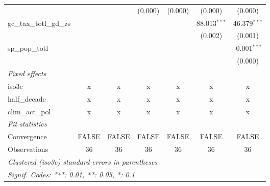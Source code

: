 \begin{tabular}{lcccccc}
                                                        &                   &                 & (0.000)           & (0.000)           & (0.000)           & (0.000)\\   
   gc\_tax\_totl\_gd\_zs                                &                   &                 &                   &                   & 88.013$^{***}$    & 46.379$^{***}$\\   
                                                        &                   &                 &                   &                   & (0.002)           & (0.001)\\   
   sp\_pop\_totl                                        &                   &                 &                   &                   &                   & -0.001$^{***}$\\   
                                                        &                   &                 &                   &                   &                   & (0.000)\\   
   \emph{Fixed effects}\\
   iso3c                                                & x                 & x               & x                 & x                 & x                 & x\\  
   half\_decade                                         & x                 & x               & x                 & x                 & x                 & x\\  
   clim\_act\_pol                                       & x                 & x               & x                 & x                 & x                 & x\\  
   \midrule \emph{Fit statistics}\\
   Convergence                                          &FALSE              & FALSE           & FALSE             & FALSE             & FALSE             & FALSE\\  
   Observations                                         & 36                & 36              & 36                & 36                & 36                & 36\\  
   \midrule
   \multicolumn{7}{l}{\emph{Clustered (iso3c) standard-errors in parentheses}}\\
   \multicolumn{7}{l}{\emph{Signif. Codes: ***: 0.01, **: 0.05, *: 0.1}}\\
\end{tabular}
\par\endgroup


